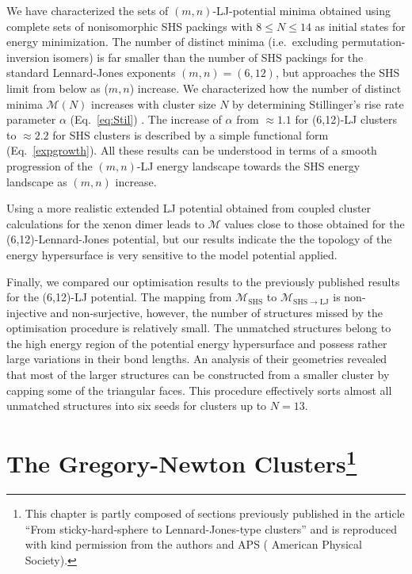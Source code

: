 We have characterized the sets of $(m,n)$-LJ-potential minima obtained using
complete sets of nonisomorphic \ac{SHS} packings with $8 \leq N \leq 14$
\autocite{Arkus_Minimalenergyclusters_2009,Arkus_DerivingFiniteSphere_2011,Hoy_Structurefinitesphere_2012,Hoy_Structuredynamicsmodel_2015,Holmes-Cerfon_EnumeratingRigidSphere_2016}
as initial states for energy minimization.  The number of distinct minima
(i.e.~excluding permutation-inversion isomers) is far smaller than the number
of \ac{SHS} packings for the standard Lennard-Jones exponents $(m,n) = (6,12)$, but
approaches the \ac{SHS} limit from below as ($m,n$) increase.  We characterized how
the number of distinct minima $\mathcal{M}(N)$ increases with cluster size $N$
by determining Stillinger's rise rate parameter $\alpha$ (Eq.\ \ref{eq:Stil})
\autocite{Stillinger_Exponentialmultiplicityinherent_1999}.  The increase of
$\alpha$ from $\approx 1.1$ for (6,12)-LJ clusters to $\approx 2.2$ for \ac{SHS}
clusters is described by a simple functional form (Eq.\ \ref{expgrowth}).  All
these results  can be understood in terms of a smooth progression of the
$(m,n)$-LJ energy landscape towards the \ac{SHS} energy landscape as $(m,n)$
increase.

Using a more realistic extended LJ potential obtained from coupled cluster
calculations for the xenon dimer
\autocite{Schwerdtfeger_ExtensionLennardJonespotential_2006,Jerabek_relativisticcoupledclusterinteraction_2017}
leads to $\mathcal{M}$ values close to those obtained for the
(6,12)-Lennard-Jones potential, but our results indicate the the topology of
the energy hypersurface is very sensitive to the model potential applied.  

Finally, we compared our optimisation results to the previously published
results for the (6,12)-LJ potential. The mapping from $\mathcal{M}_\text{SHS}$
to $\mathcal{M}_\mathrm{SHS\to LJ}$ is non-injective and non-surjective,
however, the number of structures missed by the optimisation procedure is
relatively small. The unmatched structures belong to the high energy region of
the potential energy hypersurface and possess rather large variations in their
bond lengths. An analysis of their geometries revealed that most of the larger
structures can be constructed from a smaller cluster by capping some of the
triangular faces. This procedure effectively sorts almost all unmatched
structures into six seeds for clusters up to $N=13$.


\chapter[The Gregory-Newton Clusters]{
    The Gregory-Newton Clusters\footnote{This chapter is partly composed of
    sections previously published in the article ``From sticky-hard-sphere to
    Lennard-Jones-type
    clusters''\autocite{Trombach_stickyhardsphereLennardJonestypeclusters_2018}
    and is reproduced with kind permission from the authors and APS
    ( American Physical Society).}
}
\label{sec:thegregorynewtonclusters}

